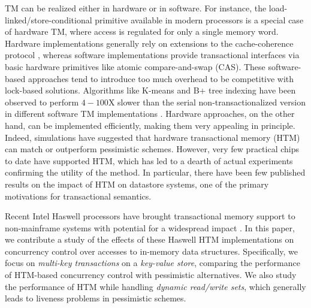 TM can be realized either in hardware or in software. For instance, the
load-linked/store-conditional primitive available in modern processors is a
special case of hardware TM, where access is regulated for only a single memory
word. Hardware implementations generally rely on extensions to the
cache-coherence protocol \citep{htm}, whereas software implementations provide transactional
interfaces via basic hardware primitives like atomic compare-and-swap
(CAS). These software-based approaches tend to introduce too much overhead to be
competitive with lock-based solutions. Algorithms like K-means and 
B+ tree indexing have been observed to perform $4-100$X
slower than the serial non-transactionalized version in different 
software TM implementations \citep{cacm08}. 
Hardware approaches, on the other hand,
can be implemented efficiently, making them very appealing in principle. Indeed,
simulations have suggested that hardware transactional memory (HTM) can match or
outperform pessimistic schemes. However, very few practical chips to date have
supported HTM, which has led to a dearth of actual experiments confirming the
utility of the method. In particular, there have been few published results on
the impact of HTM on datastore systems, one of the primary motivations for
transactional semantics.

Recent Intel Haswell processors have brought transactional memory support to
non-mainframe systems with potential for a widespread impact \citep{tsx-tools,lwn}. 
In this paper, we contribute a study
of the effects of these Haswell HTM implementations on concurrency control over 
accesses to
in-memory data structures. Specifically, we focus on \textit{multi-key
  transactions} on a \textit{key-value store}, comparing the performance of
HTM-based concurrency control with pessimistic alternatives. We also study the
performance of HTM while handling \textit{dynamic read/write sets}, which
generally leads to liveness problems in pessimistic schemes.

